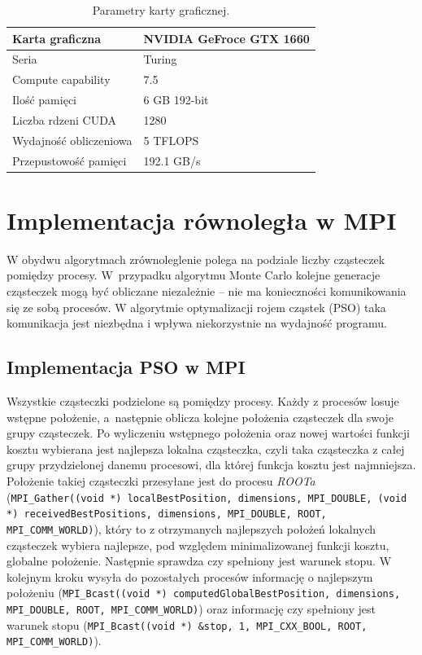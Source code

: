 \documentclass[11pt, a4paper, oneside]{article}
\begin{document}
\begin{table}[h]
\centering
\begin{tabular}{|l|l|}
\hline
Karta graficzna        			  & NVIDIA GeFroce GTX 1660 \\ \hline
Seria     						  & Turing      		    \\ \hline
Compute capability    			  & 7.5       				\\ \hline
Ilość pamięci   				  & 6 GB 192-bit   	 	    \\ \hline
Liczba rdzeni CUDA 				  & 1280    			     \\ \hline
Wydajność obliczeniowa			  & 5 TFLOPS		         \\ \hline
Przepustowość pamięci			  & 192.1 GB/s		         \\ \hline
\end{tabular}
\caption{Parametry karty graficznej.}
\label{tab:par_gpu}
\end{table}

\section{Implementacja równoległa w MPI}
W obydwu algorytmach zrównoleglenie polega na podziale liczby cząsteczek pomiędzy procesy. W~przypadku algorytmu Monte Carlo kolejne generacje cząsteczek mogą być obliczane niezależnie -- nie ma konieczności komunikowania się ze sobą procesów. W algorytmie optymalizacji rojem cząstek (PSO) taka komunikacja jest niezbędna i wpływa niekorzystnie na wydajność programu.

\subsection{Implementacja PSO w MPI}
Wszystkie cząsteczki podzielone są pomiędzy procesy. Każdy z procesów losuje wstępne położenie, a~następnie oblicza kolejne położenia cząsteczek dla swoje grupy cząsteczek. Po wyliczeniu wstępnego położenia oraz nowej wartości funkcji kosztu wybierana jest najlepsza lokalna cząsteczka, czyli taka cząsteczka z całej grupy przydzielonej danemu procesowi, dla której funkcja kosztu jest najmniejsza. Położenie takiej cząsteczki przesyłane jest do procesu \textit{ROOTa} (\lstinline[style=mycpp]{MPI_Gather((void *) localBestPosition, dimensions, MPI_DOUBLE, (void *) receivedBestPositions, dimensions, MPI_DOUBLE, ROOT, MPI_COMM_WORLD)}), który to z otrzymanych najlepszych położeń lokalnych cząsteczek wybiera najlepsze, pod względem minimalizowanej funkcji kosztu, globalne położenie. Następnie sprawdza czy spełniony jest warunek stopu. W kolejnym kroku wysyła do pozostałych procesów informację o najlepszym położeniu (\lstinline[style=mycpp]{MPI_Bcast((void *) computedGlobalBestPosition, dimensions, MPI_DOUBLE, ROOT, MPI_COMM_WORLD)}) oraz informację czy spełniony jest warunek stopu (\lstinline[style=mycpp]{MPI_Bcast((void *) &stop, 1, MPI_CXX_BOOL, ROOT, MPI_COMM_WORLD)}).
\end{document}

